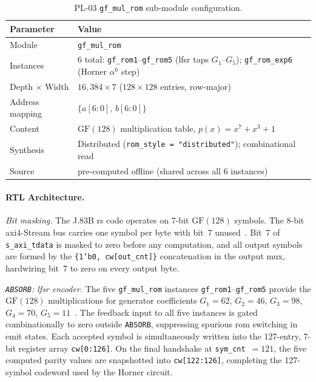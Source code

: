 \begin{table}[htbp]
  \caption{PL-03 \texttt{gf\_mul\_rom} sub-module configuration.}
  \label{tab:pl03_roms}
  \centering
  \small
  \begin{tabular}{ll}
    \hline
    Parameter            & Value \\
    \hline
    Module               & \texttt{gf\_mul\_rom} \\[2pt]
    Instances            & 6 total: \texttt{gf\_rom1}--\texttt{gf\_rom5}
                           (\ac{lfsr} taps $G_1$--$G_5$);
                           \texttt{gf\_rom\_exp6} (Horner $\alpha^6$ step) \\[2pt]
    Depth $\times$ Width & $16{,}384 \times 7$ ($128 \times 128$ entries, row-major) \\[2pt]
    Address mapping      & $\{a[6:0],\,b[6:0]\}$ \\[2pt]
    Content              & $\mathrm{GF}(128)$ multiplication table,
                           $p(x) = x^7 + x^3 + 1$ \\[2pt]
    Synthesis            & Distributed (\texttt{rom\_style = "distributed"});
                           combinational read \\[2pt]
    Source               & pre-computed offline (shared across all 6 instances) \\
    \hline
  \end{tabular}
\end{table}


\FloatBarrier
\paragraph{RTL Architecture.}

\textit{Bit masking.}
The J.83B \ac{rs} code operates on 7-bit $\mathrm{GF}(128)$ symbols.
The 8-bit \ac{axi}4-Stream bus carries one symbol per byte with bit~7
unused~\cite{ITU_J83}.
Bit~7 of \texttt{s\_axi\_tdata} is masked to zero before any
computation, and all output symbols are formed by the
\texttt{\{1'b0,\,cw[out\_cnt]\}} concatenation in the output mux,
hardwiring bit~7 to zero on every output byte.

\textit{\texttt{ABSORB}: \ac{lfsr} encoder.}
The five \texttt{gf\_mul\_rom} instances \texttt{gf\_rom1}--\texttt{gf\_rom5}
provide the $\mathrm{GF}(128)$ multiplications for generator coefficients
$G_1\!=\!62$, $G_2\!=\!46$, $G_3\!=\!98$, $G_4\!=\!70$,
$G_5\!=\!11$~\cite{ITU_J83}.
The feedback input to all five instances is gated combinationally to
zero outside \texttt{ABSORB}, suppressing spurious \ac{rom} switching
in emit states.
Each accepted symbol is simultaneously written into the 127-entry,
7-bit register array \texttt{cw[0:126]}.
On the final handshake at \texttt{sym\_cnt}~$= 121$, the five computed
parity values are snapshotted into \texttt{cw[122:126]}, completing
the 127-symbol codeword used by the Horner circuit.

